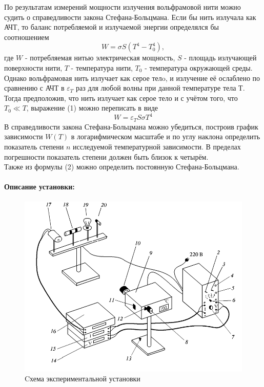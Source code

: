 \documentclass[a4paper,12pt]{article}
\begin{document}
По результатам измерений мощности излучения вольфрамовой нити можно судить о справедливости закона Стефана-Больцмана. Если бы нить излучала как АЧТ, то баланс потребляемой и излучаемой энергии определялся бы соотношением 
\begin{equation}
    W = \sigma S (T^4 - T_0^4),
\end{equation}
где $W$ - потребляемая нитью электрическая мощность, $S$ - площадь излучающей поверхности нити, $T$ - температура нити, $T_0$ - температура окружающей среды. Однако вольфрамовая нить излучает как серое телo, и излучение её ослаблено по сравнению с АЧТ в $\varepsilon_T$ раз для любой волны при данной температуре тела Т. Тогда предположив, что нить излучает как серое тело и с учётом того, что $T_0 \ll T$, выражение (1) можно переписать в виде
\begin{equation}
    W = \varepsilon_T S \sigma T^4
\end{equation}
В справедливости закона Стефана-Больцмана можно убедиться, построив график зависимости $W(T)$ в логарифмическом масштабе и по углу наклона определить показатель степени $n$ исследуемой температурной зависимости. В пределах погрешности показатель степени должен быть близок к четырём. \\
Также из формулы (2) можно определить постоянную Стефана-Больцмана.

\paragraph{Описание установки:}
\begin{figure}[h!]
\centering
\includegraphics[scale=0.5]{setup.png}
\caption{Cхема экспериментальной установки} 
\end{figure}
\end{document}
